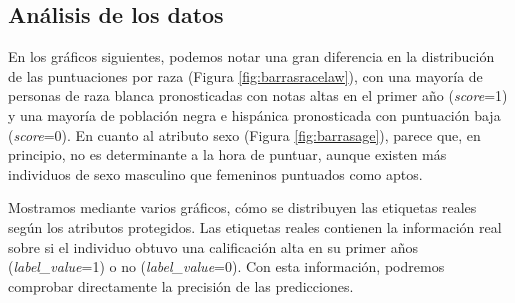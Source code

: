 \subsection*{Análisis de los datos}

En los gráficos siguientes, podemos notar una gran diferencia en la distribución de las puntuaciones por raza (Figura \ref{fig:barrasracelaw}), con una mayoría de personas de raza blanca pronosticadas con notas altas en el primer año (\textit{score}=1) y una mayoría de población negra e hispánica pronosticada con puntuación baja (\textit{score}=0). En cuanto al atributo sexo (Figura \ref{fig:barrasage}), parece que, en principio, no es determinante a la hora de puntuar, aunque existen más individuos de sexo masculino que femeninos puntuados como aptos.

Mostramos mediante varios gráficos, cómo se distribuyen las etiquetas reales según los atributos protegidos. Las etiquetas reales contienen la información real sobre si el individuo obtuvo una calificación alta en su primer años (\textit{label\_value}=1) o no (\textit{label\_value}=0). Con esta información, podremos comprobar directamente la precisión de las predicciones.

\clearpage

